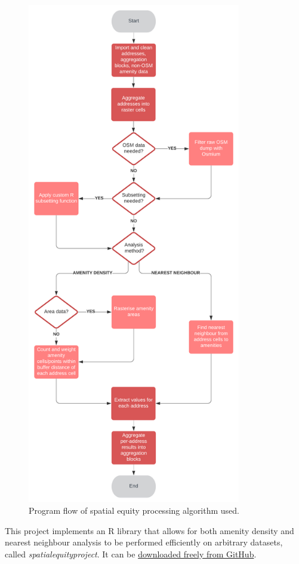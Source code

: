 \documentclass[12pt,a4paper]{article}
\begin{document}
\begin{figure}[!htbp]
	\begin{center}
		\includegraphics[height=220mm]{./figures/algorithm_flow.png}
		\caption{Program flow of spatial equity processing algorithm used.}
		\label{fig:flow}
	\end{center}
\end{figure}


This project implements an R library that allows for both amenity density and nearest neighbour analysis to be performed efficiently on arbitrary datasets, called \emph{spatialequityproject}. It can be \href{https://github.com/Scienciser/spatialequityproject}{downloaded freely from GitHub}.
\end{document}
